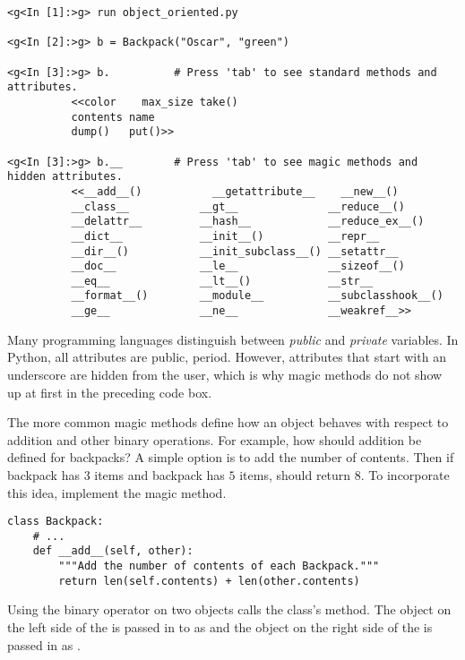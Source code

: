 \begin{lstlisting}
<g<In [1]:>g> run object_oriented.py

<g<In [2]:>g> b = Backpack("Oscar", "green")

<g<In [3]:>g> b.          # Press 'tab' to see standard methods and attributes.
          <<color    max_size take()
          contents name
          dump()   put()>>

<g<In [3]:>g> b.__        # Press 'tab' to see magic methods and hidden attributes.
          <<__add__()           __getattribute__    __new__()
          __class__           __gt__              __reduce__()
          __delattr__         __hash__            __reduce_ex__()
          __dict__            __init__()          __repr__
          __dir__()           __init_subclass__() __setattr__
          __doc__             __le__              __sizeof__()
          __eq__              __lt__()            __str__
          __format__()        __module__          __subclasshook__()
          __ge__              __ne__              __weakref__>>
\end{lstlisting}

\begin{info}
Many programming languages distinguish between \emph{public} and \emph{private} variables.
In Python, all attributes are public, period.
However, attributes that start with an underscore are hidden from the user, which is why magic methods do not show up at first in the preceding code box.
\end{info}

The more common magic methods define how an object behaves with respect to addition and other binary operations.
For example, how should addition be defined for backpacks?
A simple option is to add the number of contents.
Then if backpack  has $3$ items and backpack  has $5$ items,  should return $8$.
To incorporate this idea, implement the  magic method.

\begin{lstlisting}
class Backpack:
    # ...
    def __add__(self, other):
        """Add the number of contents of each Backpack."""
        return len(self.contents) + len(other.contents)
\end{lstlisting}

Using the \li{+} binary operator on two  objects calls the class's  method.
The object on the left side of the \li{+} is passed in to  as  and the object on the right side of the \li{+} is passed in as .

